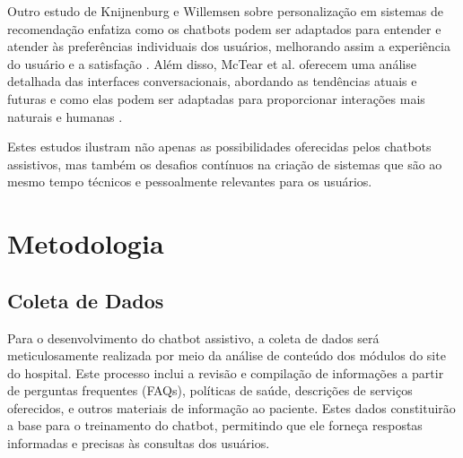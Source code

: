 \documentclass[conference]{IEEEtran}
\begin{document}
Outro estudo de Knijnenburg e Willemsen sobre personalização em sistemas de recomendação enfatiza como os chatbots 
podem ser adaptados para entender e atender às preferências individuais dos usuários, melhorando assim a experiência 
do usuário e a satisfação \cite{Knijnenburg2016}. 
Além disso, McTear et al. oferecem uma análise detalhada das interfaces conversacionais, 
abordando as tendências atuais e futuras e como elas podem ser adaptadas 
para proporcionar interações mais naturais e humanas \cite{McTear2016}.

Estes estudos ilustram não apenas as possibilidades oferecidas pelos chatbots assistivos, 
mas também os desafios contínuos na criação de sistemas que são 
ao mesmo tempo técnicos e pessoalmente relevantes para os usuários.









\section{Metodologia}

\subsection{Coleta de Dados}
Para o desenvolvimento do chatbot assistivo, a coleta de dados será meticulosamente realizada 
por meio da análise de conteúdo dos módulos do site do hospital. 
Este processo inclui a revisão e compilação de informações a partir de 
perguntas frequentes (FAQs), políticas de saúde, descrições de serviços oferecidos, 
e outros materiais de informação ao paciente. 
Estes dados constituirão a base para o treinamento do chatbot, 
permitindo que ele forneça respostas informadas e precisas às consultas dos usuários.
\end{document}
